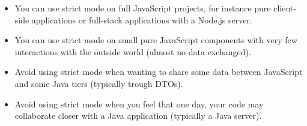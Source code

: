 \documentclass[a4paper]{report}
\begin{document}
\begin{itemize}
\item You can use strict mode on full JavaScript projects, for instance pure client-side applications or full-stack applications with a Node.js server.
\item You can use strict mode on small pure JavaScript components with very few interactions with the outside world (almost no data exchanged).
\item Avoid using strict mode when wanting to share some data between JavaScript and some Java tiers (typically trough DTOs).
\item Avoid using strict mode when you feel that one day, your code may collaborate closer with a Java application (typically a Java server).
\end{itemize}
        
\end{document}
